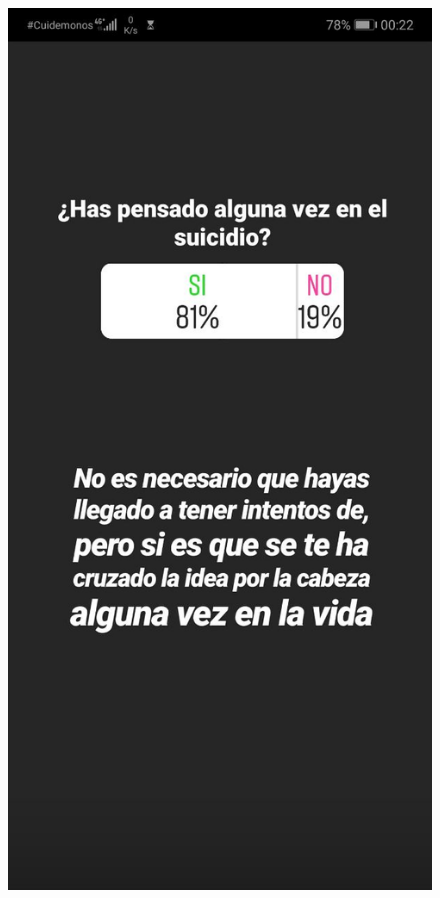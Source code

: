 \begin{figure}[h]
\begin{minipage}{.3\textwidth}
    \end{minipage}
    \begin{minipage}{.3\textwidth}
        \includegraphics[width=\textwidth]{imgs/insta2.jpg}

\end{minipage}
\end{figure}
